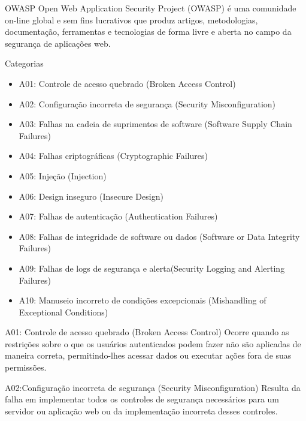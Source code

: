 \documentclass{if-beamer}
\begin{document}
	\begin{frame}{OWASP}
		Open Web Application Security Project (OWASP) é uma comunidade on-line global e sem fins lucrativos que produz artigos,  metodologias, documentação, ferramentas e tecnologias de forma livre e aberta no campo da segurança de aplicações web.

	\end{frame}
		 \begin{frame}[allowframebreaks]{Categorias}
			\begin{itemize}
				\item A01: Controle de acesso quebrado (Broken Access Control)
				\item A02: Configuração incorreta de segurança (Security Misconfiguration)
				\item A03: Falhas na cadeia de suprimentos de software (Software Supply Chain Failures)
				\item A04: Falhas criptográficas (Cryptographic Failures)
				\item A05: Injeção (Injection)
			\end{itemize}
		\framebreak
			\begin{itemize}
				\item A06: Design inseguro (Insecure Design)
				\item A07: Falhas de autenticação (Authentication Failures)
				\item A08: Falhas de integridade de software ou dados (Software or Data Integrity Failures)
				\item A09: Falhas de logs de segurança e alerta(Security Logging and Alerting Failures)
				\item A10: Manuseio incorreto de condições excepcionais (Mishandling of Exceptional Conditions)
			\end{itemize}
		\framebreak
		\begin{block}{A01: Controle de acesso quebrado (Broken Access Control)}
		Ocorre quando as restrições sobre o que os usuários autenticados podem fazer não são aplicadas
		de maneira correta, permitindo-lhes acessar dados ou executar ações fora de suas permissões.
		\end{block}
        \begin{block}{A02:Configuração incorreta de segurança (Security Misconfiguration) }
			Resulta da falha em implementar todos os controles de segurança necessários para um servidor ou aplicação web
			 ou da implementação incorreta desses controles.
		\end{block}


\end{frame}
\end{document}
